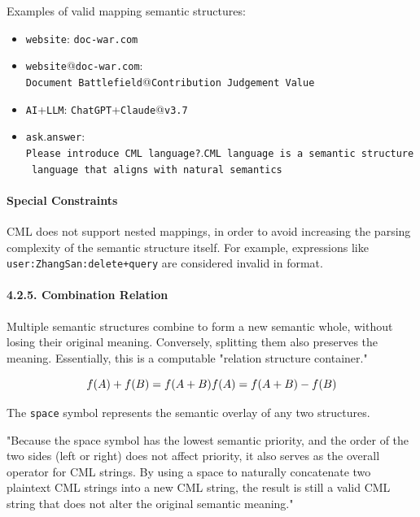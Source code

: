 \documentclass[conference]{IEEEtran}
\begin{document}
Examples of valid mapping semantic structures:

\begin{itemize}
\item
  \texttt{website}: \texttt{doc-war.com}
\item
  \begin{sloppypar}
  \texttt{website}@\texttt{doc-war.com}:
  \texttt{Document\ Battlefield}@\texttt{Contribution\ Judgement\ Value}
  \end{sloppypar}
\item
  \texttt{AI}+\texttt{LLM}:
  \texttt{ChatGPT}+\texttt{Claude}@\texttt{v3.7}
\item
  \begin{sloppypar}
  \texttt{ask}.\texttt{answer}:
  \texttt{Please\ introduce\ CML\ language?}.\texttt{CML\ language\ is\ a\ semantic\ structure\ language\ that\ aligns\ with\ natural\ semantics}
  \end{sloppypar}
\end{itemize}

\paragraph{Special Constraints}\label{special-constraints}

CML does not support nested mappings, in order to avoid increasing the
parsing complexity of the semantic structure itself. For example,
expressions like \texttt{user:ZhangSan:delete+query} are considered
invalid in format.

\paragraph{4.2.5. Combination Relation}\label{425-combination-relation}

Multiple semantic structures combine to form a new semantic whole,
without losing their original meaning. Conversely, splitting them also
preserves the meaning. Essentially, this is a computable "relation
structure container."

\[f(A)+f(B) =f(A+B)
\\
f(A) =f(A+B) - f(B)\]

The \texttt{space} symbol represents the semantic overlay of any two
structures.

"Because the space symbol has the lowest semantic priority, and the
order of the two sides (left or right) does not affect priority, it also
serves as the overall operator for CML strings. By using a space to
naturally concatenate two plaintext CML strings into a new CML string,
the result is still a valid CML string that does not alter the original
semantic meaning."
\end{document}

